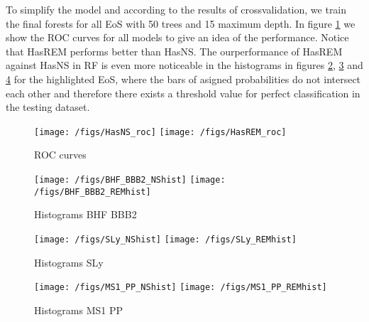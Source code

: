 To simplify the model and according to the results of crossvalidation, we train the final forests for all EoS with 50 trees and 15 maximum depth. In figure \ref{fig:RF_roc} we show the ROC curves for all models to give an idea of the performance. Notice that HasREM performs better than HasNS. The ourperformance of HasREM against HasNS in RF is even more noticeable in the histograms in figures \ref{fig:RF_hist_BHFBBB2}, \ref{fig:RF_hist_SLY} and \ref{fig:RF_hist_MS1PP} for the highlighted EoS, where the bars of asigned probabilities do not intersect each other and therefore there exists a threshold value for perfect classification in the testing dataset.

\begin{figure}
\centering
\texttt{[image: /figs/HasNS\_roc]}
\texttt{[image: /figs/HasREM\_roc]}
\caption{\label{fig:RF_roc} ROC curves}
\end{figure}

\begin{figure}
\centering
\texttt{[image: /figs/BHF\_BBB2\_NShist]}
\texttt{[image: /figs/BHF\_BBB2\_REMhist]}
\caption{\label{fig:RF_hist_BHFBBB2} Histograms BHF BBB2}
\end{figure}

\begin{figure}
\centering
\texttt{[image: /figs/SLy\_NShist]}
\texttt{[image: /figs/SLy\_REMhist]}
\caption{\label{fig:RF_hist_SLY} Histograms SLy}
\end{figure}

\begin{figure}
\centering
\texttt{[image: /figs/MS1\_PP\_NShist]}
\texttt{[image: /figs/MS1\_PP\_REMhist]}
\caption{\label{fig:RF_hist_MS1PP} Histograms MS1 PP}
\end{figure}


